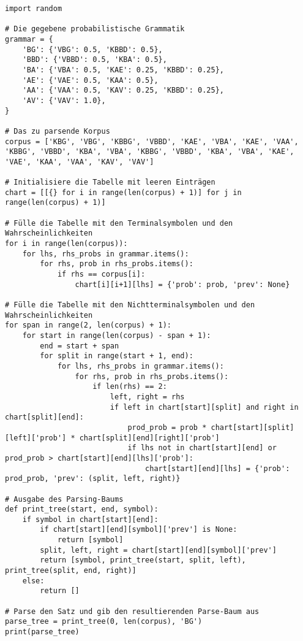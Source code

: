 \documentclass[12pt]{article}
\begin{document}
\begin{verbatim}
import random

# Die gegebene probabilistische Grammatik
grammar = {
    'BG': {'VBG': 0.5, 'KBBD': 0.5},
    'BBD': {'VBBD': 0.5, 'KBA': 0.5},
    'BA': {'VBA': 0.5, 'KAE': 0.25, 'KBBD': 0.25},
    'AE': {'VAE': 0.5, 'KAA': 0.5},
    'AA': {'VAA': 0.5, 'KAV': 0.25, 'KBBD': 0.25},
    'AV': {'VAV': 1.0},
}

# Das zu parsende Korpus
corpus = ['KBG', 'VBG', 'KBBG', 'VBBD', 'KAE', 'VBA', 'KAE', 'VAA', 'KBBG', 'VBBD', 'KBA', 'VBA', 'KBBG', 'VBBD', 'KBA', 'VBA', 'KAE', 'VAE', 'KAA', 'VAA', 'KAV', 'VAV']

# Initialisiere die Tabelle mit leeren Einträgen
chart = [[{} for i in range(len(corpus) + 1)] for j in range(len(corpus) + 1)]

# Fülle die Tabelle mit den Terminalsymbolen und den Wahrscheinlichkeiten
for i in range(len(corpus)):
    for lhs, rhs_probs in grammar.items():
        for rhs, prob in rhs_probs.items():
            if rhs == corpus[i]:
                chart[i][i+1][lhs] = {'prob': prob, 'prev': None}

# Fülle die Tabelle mit den Nichtterminalsymbolen und den Wahrscheinlichkeiten
for span in range(2, len(corpus) + 1):
    for start in range(len(corpus) - span + 1):
        end = start + span
        for split in range(start + 1, end):
            for lhs, rhs_probs in grammar.items():
                for rhs, prob in rhs_probs.items():
                    if len(rhs) == 2:
                        left, right = rhs
                        if left in chart[start][split] and right in chart[split][end]:
                            prod_prob = prob * chart[start][split][left]['prob'] * chart[split][end][right]['prob']
                            if lhs not in chart[start][end] or prod_prob > chart[start][end][lhs]['prob']:
                                chart[start][end][lhs] = {'prob': prod_prob, 'prev': (split, left, right)}

# Ausgabe des Parsing-Baums
def print_tree(start, end, symbol):
    if symbol in chart[start][end]:
        if chart[start][end][symbol]['prev'] is None:
            return [symbol]
        split, left, right = chart[start][end][symbol]['prev']
        return [symbol, print_tree(start, split, left), print_tree(split, end, right)]
    else:
        return []

# Parse den Satz und gib den resultierenden Parse-Baum aus
parse_tree = print_tree(0, len(corpus), 'BG')
print(parse_tree)

\end{verbatim}
\end{document}
